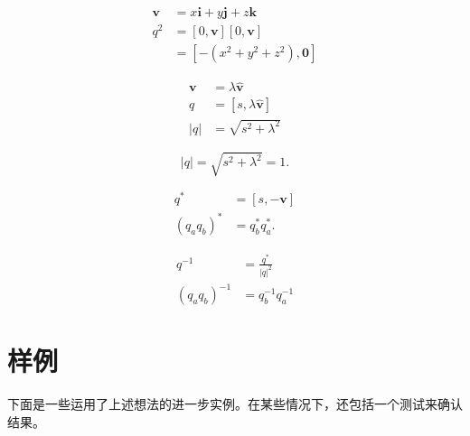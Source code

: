 \begin{tcolorbox}[breakable, enhanced,title = {纯四元数}]
    $$
        \begin{aligned}
            \mathbf{v} & =x \mathbf{i}+y \mathbf{j}+z \mathbf{k}                   \\
            q^{2}      & =[0, \mathbf{v}][0, \mathbf{v}]                           \\
                       & =\left[-\left(x^{2}+y^{2}+z^{2}\right), \mathbf{0}\right]
        \end{aligned}
    $$
\end{tcolorbox}

\begin{tcolorbox}[breakable, enhanced,title = {范数}]
    $$
        \begin{aligned}
            \mathbf{v} & =\lambda \hat{\mathbf{v}}      \\
            q          & =[s, \lambda \hat{\mathbf{v}}] \\
            |q|        & =\sqrt{s^{2}+\lambda^{2}}
        \end{aligned}
    $$
\end{tcolorbox}

\begin{tcolorbox}[breakable, enhanced,title = {单位范数}]
    $$
        |q|=\sqrt{s^{2}+\lambda^{2}}=1 .
    $$
\end{tcolorbox}

\begin{tcolorbox}[breakable, enhanced,title = {共轭}]
    $$
        \begin{aligned}
            q^{*}                        & =[s,-\mathbf{v}]       \\
            \left(q_{a} q_{b}\right)^{*} & =q_{b}^{*} q_{a}^{*} .
        \end{aligned}
    $$
\end{tcolorbox}

\begin{tcolorbox}[breakable, enhanced,title = {逆}]
    $$
        \begin{aligned}
            q^{-1}                        & =\frac{q^{*}}{|q|^{2}} \\
            \left(q_{a} q_{b}\right)^{-1} & =q_{b}^{-1} q_{a}^{-1}
        \end{aligned}
    $$
\end{tcolorbox}

\section{样例}
下面是一些运用了上述想法的进一步实例。在某些情况下，还包括一个测试来确认结果。

